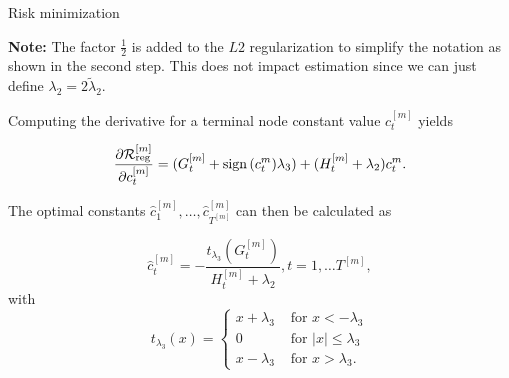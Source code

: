 \begin{vbframe}{Risk minimization}
    \lz

    \textbf{Note:} The factor $\frac12$ is added to the $L2$ regularization to simplify the notation as shown in the second step.
    This does not impact estimation since we can just define $\lambda_2 = 2\tilde\lambda_2$.

    \framebreak

    Computing the derivative for a terminal node constant value $c^{[m]}_t$ yields

    $$
    \frac{\partial \mathcal{R}_{\text{reg}}^{[m]}}{\partial c^{[m]}_t} = (G^{[m]}_t + \operatorname{sign}{(c^{m}_t)}\lambda_3) + (H^{[m]}_t + \lambda_2) c^{m}_t.
    $$

    The optimal constants $\hat{c}^{[m]}_1,\dots, \hat{c}^{[m]}_{T^{[m]}}$ can then be calculated as

    \lz
    $$
    \hat{c}^{[m]}_t = - \frac{t_{\lambda_3}\left(G^{[m]}_t\right)}{H^{[m]}_t + \lambda_2}, t=1,\dots T^{[m]},
    $$
    with $$t_{\lambda_3}(x) = \begin{cases}
      x + \lambda_3 &\text{ for } x < - \lambda_3 \\
      0  &\text{ for } |x| \leq \lambda_3 \\
      x - \lambda_3 &\text{ for } x > \lambda_3.
    \end{cases}$$

    \end{vbframe}



